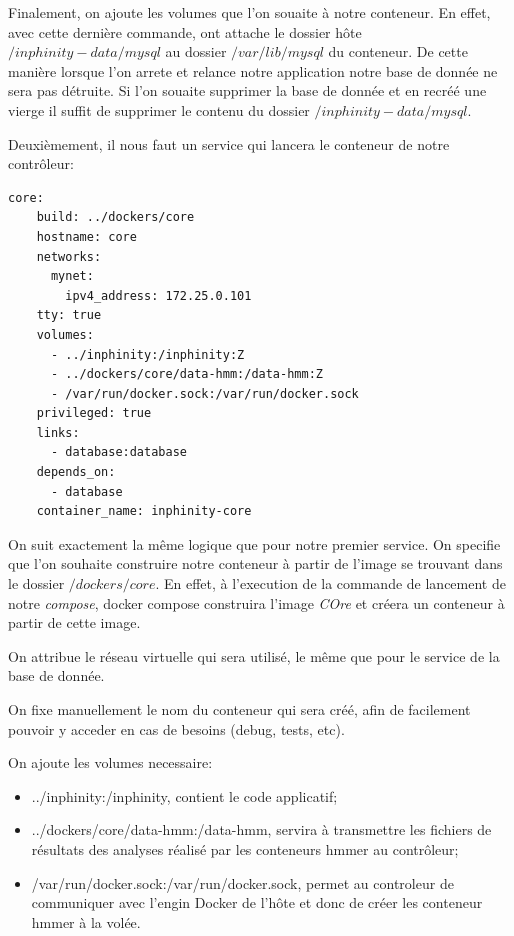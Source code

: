 Finalement, on ajoute les volumes que l'on souaite à notre conteneur. En effet, avec cette dernière commande, ont attache le dossier hôte \emph{$/inphinity-data/mysql$} au dossier \emph{$/var/lib/mysql$} du conteneur. De cette manière lorsque l'on arrete et relance notre application notre base de donnée ne sera pas détruite. Si l'on souaite supprimer la base de donnée et en recréé une vierge il suffit de supprimer le contenu du dossier \emph{$/inphinity-data/mysql$}.

Deuxièmement, il nous faut un service qui lancera le conteneur de notre contrôleur:

\begin{lstlisting}[frame=single]
core:
    build: ../dockers/core
    hostname: core
    networks:
      mynet:
        ipv4_address: 172.25.0.101
    tty: true
    volumes:
      - ../inphinity:/inphinity:Z
      - ../dockers/core/data-hmm:/data-hmm:Z
      - /var/run/docker.sock:/var/run/docker.sock
    privileged: true
    links:
      - database:database
    depends_on:
      - database
    container_name: inphinity-core
\end{lstlisting}

On suit exactement la même logique que pour notre premier service. On specifie que l'on souhaite construire notre conteneur à partir de l'image se trouvant dans le dossier \emph{$/dockers/core$}. En effet, à l'execution de la commande de lancement de notre \emph{compose}, docker compose construira l'image \emph{COre} et créera un conteneur à partir de cette image.

On attribue le réseau virtuelle qui sera utilisé, le même que pour le service de la base de donnée.

On fixe manuellement le nom du conteneur qui sera créé, afin de facilement pouvoir y acceder en cas de besoins (debug, tests, etc).

On ajoute les volumes necessaire:

\begin{itemize}
\item ../inphinity:/inphinity, contient le code applicatif;
\item ../dockers/core/data-hmm:/data-hmm, servira à transmettre les fichiers de résultats des analyses réalisé par les conteneurs hmmer au contrôleur;
\item /var/run/docker.sock:/var/run/docker.sock, permet au controleur de communiquer avec l'engin Docker de l'hôte et donc de créer les conteneur hmmer à la volée.
\end{itemize}

